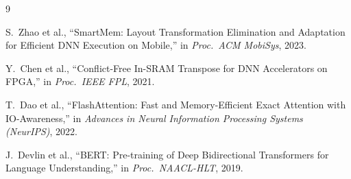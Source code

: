\documentclass[11pt]{article}
\begin{document}
\begin{thebibliography}{9}

S.~Zhao et al., ``SmartMem: Layout Transformation Elimination and Adaptation
for Efficient DNN Execution on Mobile,'' in \emph{Proc.\ ACM MobiSys}, 2023.

Y.~Chen et al., ``Conflict-Free In-SRAM Transpose for DNN Accelerators on
FPGA,'' in \emph{Proc.\ IEEE FPL}, 2021.

T.~Dao et al., ``FlashAttention: Fast and Memory-Efficient Exact Attention
with IO-Awareness,'' in \emph{Advances in Neural Information Processing
Systems (NeurIPS)}, 2022.

J.~Devlin et al., ``BERT: Pre-training of Deep Bidirectional Transformers for
Language Understanding,'' in \emph{Proc.\ NAACL-HLT}, 2019.

\end{thebibliography}
\end{document}
